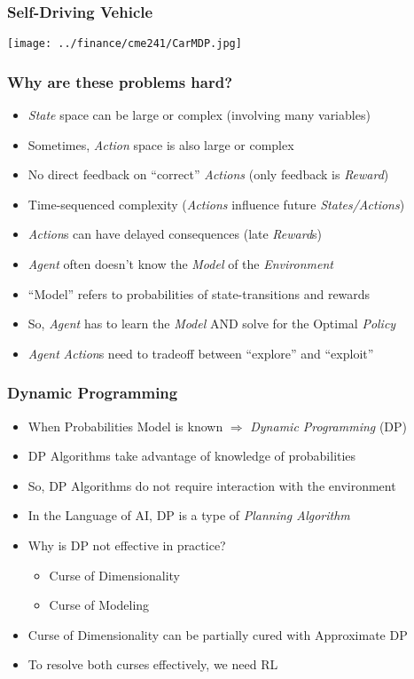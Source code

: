 \documentclass[handout]{beamer}
\begin{document}
\begin{frame}
\frametitle{Self-Driving Vehicle}
\texttt{[image: ../finance/cme241/CarMDP.jpg]}
\end{frame}

\begin{frame}
\frametitle{Why are these problems hard?}
\pause
\begin{itemize}[<+->]
\item {\em State} space can be large or complex (involving many variables)
\item Sometimes, {\em Action} space is also large or complex
\item No direct feedback on ``correct'' {\em Actions} (only feedback is {\em Reward})
\item Time-sequenced complexity ({\em Actions} influence future {\em States/Actions})
\item {\em Action}s can have delayed consequences (late {\em Reward}s)
\item {\em Agent} often doesn't know the {\em Model} of the {\em Environment}
\item ``Model'' refers to probabilities of state-transitions and rewards
\item So, {\em Agent} has to learn the {\em Model} AND solve for the Optimal {\em Policy}
\item {\em Agent} {\em Action}s need to tradeoff between ``explore'' and ``exploit''
\end{itemize}
\end{frame}


\begin{frame}
\frametitle{Dynamic Programming}
\pause
\begin{itemize}[<+->]
\item When Probabilities Model is known $\Rightarrow$ {\em Dynamic Programming} (DP)
\item DP Algorithms take advantage of knowledge of probabilities
\item So, DP Algorithms do not require interaction with the environment
\item In the Language of AI, DP is a type of {\em Planning Algorithm}
\item Why is DP not effective in practice?
\pause
\begin{itemize}[<+->]
\item Curse of Dimensionality
\item Curse of Modeling
\end{itemize}
\item Curse of Dimensionality can be partially cured with Approximate DP
\item To resolve both curses effectively, we need RL
\end{itemize}
\end{frame}
\end{document}
